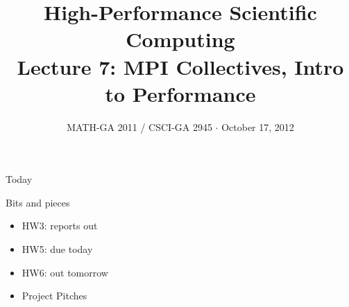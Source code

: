 \documentclass[english,compress]{beamer}
\begin{document}

\title{High-Performance Scientific Computing\\Lecture 7: MPI Collectives, Intro to Performance}

\date{MATH-GA 2011 / CSCI-GA 2945 $\cdot$ October 17, 2012}

\frame{\titlepage}

\begin{frame}{Today}
  \tableofcontents[hideallsubsections]
\end{frame}
\begin{frame}{Bits and pieces}
  \begin{itemize}
    \item HW3: reports out
    \item HW5: due today
    \item HW6: out tomorrow
    \item Project Pitches
  \end{itemize}
\end{frame}
\end{document}
